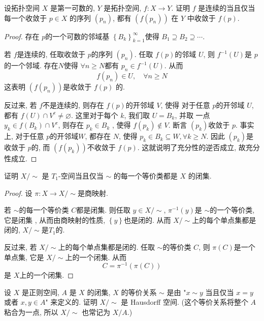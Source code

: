 \documentclass[../main.tex]{subfiles}
\begin{document}
\begin{exercise}{}{}
设拓扑空间 $X$ 是第一可数的, $Y$ 是拓扑空间, $f: X \to Y$. 证明 $f$ 是连续的当且仅当每一个收敛于 $p \in X$ 的序列 $(p_n)$, 都有 $(f(p_n))$ 在 $Y$ 中收敛于 $f(p)$.
\end{exercise}
\begin{proof}
    存在 \(  p  \)的一个可数的邻域基 \(  \left\{ B_{k} \right\}_{k= 1}^{\infty}  \)使得 \(  B_1\supseteq B_2\supseteq \cdots   \). 


    若 \(  f  \)是连续的, 任取收敛于 \(  p  \)的序列 \(  \left( p_{n} \right)   \). 任取 \(  f\left( p \right)   \)的邻域 \(  U  \), 则 \(  f^{-1} \left( U \right)   \)是 \(  p  \)的一个邻域. 存在\(  N  \)使得 \(  \forall n\ge N  \)都有 \(  p_{n}\in f^{-1} \left( U \right)   \). 从而 \[
    f\left( p_{n} \right)\in U ,\quad \forall n\ge N
    \]这表明 \(  \left( f\left( p_{n} \right)  \right)   \)是收敛于 \(  f\left( p \right)   \) 的.         

    反过来, 若 \(  f  \)不是连续的,      则存在 \(  f\left( p \right)   \)的开邻域 \(  V  \), 使得 对于任意 \(  p  \)的开邻域 \(  U  \), 都有 \(  f\left( U \right)\cap V^{c}\neq \varnothing   \). 这里对于每个 \(  k  \), 我们取 \(  U= B_{k}  \), 并取 一点 \(  y_{k}\in f\left( B_{k} \right)\cap V^{c}   \), 则存在 \(  p_{k}  \in B_{k}\) , 使得 \(  f\left( p_{k} \right)\not \in V   \). 断言 \(  \left( p_{k} \right)   \)收敛于 \(  p  \). 事实上, 对于任意 \(  p  \)的开邻域\( W  \), 都存在 \(  N  \), 使得 \(  p_{k}\in B_{k}\subseteq W, \forall k\ge N  \). 因此 \(  \left( p_{k} \right)   \)是收敛于 \(  p  \)的, 而 \(  \left( f\left( p_{k} \right)  \right)   \)不收敛于 \(  f\left( p \right)   \). 这就说明了充分性的逆否成立, 故充分性成立.    
\end{proof}
\begin{exercise}{}{}
证明 $X/\sim$ 是 $T_1$-空间当且仅当 $\sim$ 的每一个等价类都是 $X$ 的闭集.
\end{exercise}
\begin{proof}
    设 \(   \pi :X\to X/\sim   \)是商映射. 

若 \(  \sim   \)的每一个等价类 \(  C  \)都是闭集. 则任取 \(  y \in X/ \sim   \), \(   \pi ^{-1} \left( y \right)   \)是 \(  \sim   \)的一个等价类, 它是闭集  , 从而由商映射的性质, \(  \left\{ y \right\}  \)也是闭的. 从而 \(  X / \sim   \)上的每个单点集都是闭的,  \(  X /\sim   \)是\(  T_1  \)的.         

反过来, 若 \(  X / \sim   \)上的每个单点集都是闭的. 任取 \(  \sim   \)的等价类 \(  C  \), 则 \(   \pi \left( C \right)   \)是一个单点集, 它是 \(  X / \sim   \)上的一个闭集. 从而  \[
C=  \pi ^{-1} \left(  \pi \left( C \right)  \right) 
\]     是 \(  X  \)上的一个闭集. 
\end{proof}
\begin{exercise}{}{}
设 $X$ 是正则空间, $A$ 是 $X$ 的闭集, $X$ 的等价关系 $\sim$ 是由 "$x \sim y$ 当且仅当 $x = y$ 或者 $x, y \in A$" 来定义的. 证明 $X/\sim$ 是 Hausdorff 空间. (这个等价关系将整个 $A$ 粘合为一点, 所以 $X/\sim$ 也常记为 $X/A$.)
\end{exercise}
\end{document}
